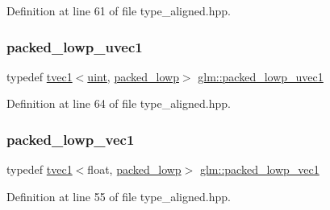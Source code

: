 Definition at line 61 of file type\+\_\+aligned.\+hpp.

\mbox{\label{group__gtc__type__aligned_gac7075bf9986d0fda492553dcc8dba144}} 
\subsubsection{\texorpdfstring{packed\_lowp\_uvec1}{packed\_lowp\_uvec1}}
{\footnotesize\ttfamily typedef \mbox{\hyperlink{structglm_1_1tvec1}{tvec1}}$<$\mbox{\hyperlink{group__core__precision_ga4fd29415871152bfb5abd588334147c8}{uint}}, \mbox{\hyperlink{namespaceglm_a0f04f086094c747d227af4425893f545ac36a4bd74559be2c0b65bc48e5953b8b}{packed\+\_\+lowp}}$>$ \mbox{\hyperlink{group__gtc__type__aligned_gac7075bf9986d0fda492553dcc8dba144}{glm\+::packed\+\_\+lowp\+\_\+uvec1}}}



Definition at line 64 of file type\+\_\+aligned.\+hpp.

\mbox{\label{group__gtc__type__aligned_gaabe6eb85a9090961e1f8fc809dabc0e9}} 
\subsubsection{\texorpdfstring{packed\_lowp\_vec1}{packed\_lowp\_vec1}}
{\footnotesize\ttfamily typedef \mbox{\hyperlink{structglm_1_1tvec1}{tvec1}}$<$float, \mbox{\hyperlink{namespaceglm_a0f04f086094c747d227af4425893f545ac36a4bd74559be2c0b65bc48e5953b8b}{packed\+\_\+lowp}}$>$ \mbox{\hyperlink{group__gtc__type__aligned_gaabe6eb85a9090961e1f8fc809dabc0e9}{glm\+::packed\+\_\+lowp\+\_\+vec1}}}



Definition at line 55 of file type\+\_\+aligned.\+hpp.

\mbox{\label{group__gtc__type__aligned_ga556942046cd364d388d949bddd4c8111}} 
